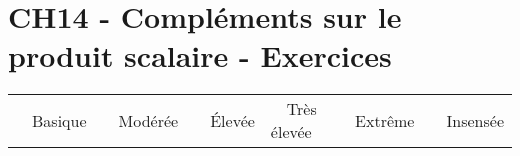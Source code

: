 \documentclass[a4paper,11pt]{article}
\author{Pierquet}
\title{\nomfichier}
\begin{document}
\pagestyle{fancy}

\part{CH14 - Compléments sur le produit scalaire - Exercices}

\medskip

\begin{caide}
	{\setlength\arrayrulewidth{1.5pt} 
		\begin{tabularx}{\linewidth}{Y|Y|Y|Y|Y|Y}
			~~\textsf{Basique} & ~~\textsf{Modérée} & ~~\textsf{Élevée} & ~~\textsf{Très élevée} & ~~\textsf{Extrême} & ~~\textsf{Insensée} \\
	\end{tabularx}}
\end{caide}

\end{document}
